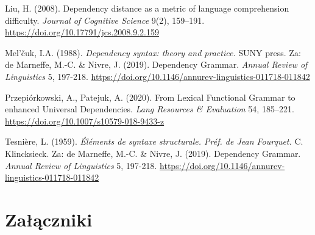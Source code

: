 \documentclass[licencjacka]{pracamgr_Kogni}
\begin{document}
\begin{thebibliography}{99}
Liu, H. (2008). Dependency distance as a metric of language comprehension difficulty. \textit{Journal of Cognitive Science} 9(2), 159–191. \url{https://doi.org/10.17791/jcs.2008.9.2.159}

Mel'čuk, I.A. (1988). \textit{Dependency syntax: theory and practice.} SUNY press. Za: de Marneffe, M.-C. \& Nivre, J. (2019). Dependency Grammar. \textit{Annual Review of Linguistics} 5, 197-218. \url{https://doi.org/10.1146/annurev-linguistics-011718-011842}

Przepiórkowski, A., Patejuk, A. (2020). From Lexical Functional Grammar to enhanced Universal Dependencies. \textit{Lang Resources \& Evaluation} 54, 185–221. \url{https://doi.org/10.1007/s10579-018-9433-z}

Tesnière, L. (1959). \textit{Éléments de syntaxe structurale. Préf. de Jean Fourquet.} C. Klincksieck. Za: de Marneffe, M.-C. \& Nivre, J. (2019). Dependency Grammar. \textit{Annual Review of Linguistics} 5, 197-218. \url{https://doi.org/10.1146/annurev-linguistics-011718-011842}

\end{thebibliography}


\chapter*{Załączniki}
\end{document}
